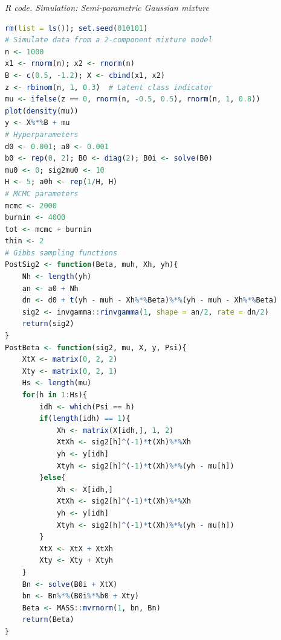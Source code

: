 \begin{enumerate}[leftmargin=*]
\begin{tcolorbox}[enhanced,width=4.67in,center upper,
	fontupper=\large\bfseries,drop shadow southwest,sharp corners]
	\textit{R code. Simulation: Semi-parametric Gaussian mixture}
	\begin{VF}
		\begin{lstlisting}[language=R]
rm(list = ls()); set.seed(010101)
# Simulate data from a 2-component mixture model
n <- 1000
x1 <- rnorm(n); x2 <- rnorm(n)
B <- c(0.5, -1.2); X <- cbind(x1, x2)
z <- rbinom(n, 1, 0.3)  # Latent class indicator
mu <- ifelse(z == 0, rnorm(n, -0.5, 0.5), rnorm(n, 1, 0.8))
plot(density(mu))
y <- X%*%B + mu
# Hyperparameters
d0 <- 0.001; a0 <- 0.001
b0 <- rep(0, 2); B0 <- diag(2); B0i <- solve(B0)
mu0 <- 0; sig2mu0 <- 10
H <- 5; a0h <- rep(1/H, H)
# MCMC parameters
mcmc <- 2000
burnin <- 4000
tot <- mcmc + burnin
thin <- 2
# Gibbs sampling functions
PostSig2 <- function(Beta, muh, Xh, yh){
	Nh <- length(yh)
	an <- a0 + Nh
	dn <- d0 + t(yh - muh - Xh%*%Beta)%*%(yh - muh - Xh%*%Beta)
	sig2 <- invgamma::rinvgamma(1, shape = an/2, rate = dn/2)
	return(sig2)
}
PostBeta <- function(sig2, mu, X, y, Psi){
	XtX <- matrix(0, 2, 2)
	Xty <- matrix(0, 2, 1)
	Hs <- length(mu)
	for(h in 1:Hs){
		idh <- which(Psi == h)
		if(length(idh) == 1){
			Xh <- matrix(X[idh,], 1, 2)
			XtXh <- sig2[h]^(-1)*t(Xh)%*%Xh
			yh <- y[idh]
			Xtyh <- sig2[h]^(-1)*t(Xh)%*%(yh - mu[h])
		}else{
			Xh <- X[idh,]
			XtXh <- sig2[h]^(-1)*t(Xh)%*%Xh
			yh <- y[idh]
			Xtyh <- sig2[h]^(-1)*t(Xh)%*%(yh - mu[h])
		}
		XtX <- XtX + XtXh
		Xty <- Xty + Xtyh
	}
	Bn <- solve(B0i + XtX)
	bn <- Bn%*%(B0i%*%b0 + Xty)
	Beta <- MASS::mvrnorm(1, bn, Bn)
	return(Beta)
}
\end{lstlisting}
	\end{VF}
\end{tcolorbox} 


\end{enumerate}
